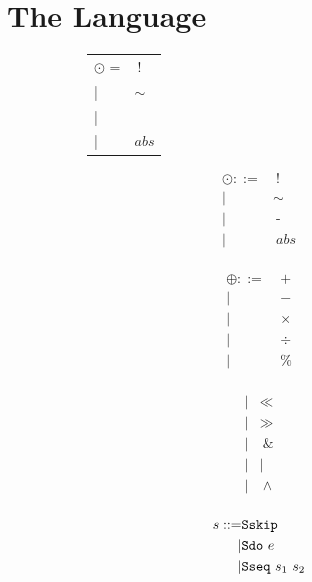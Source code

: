 \documentclass[acmsmall,review,anonymous]{acmart}\settopmatter{printfolios=true,printccs=false,printacmref=false}
\begin{document}
\section{The Language}

\begin{figure}
  \begin{subfigure}[t]{0.3\textwidth}
    \begin{minipage}[t]{0.4\textwidth}
      \begin{tabular}{l l}
        \(\odot\) = & \(~!\) \\
        | &\(\sim\) \\
        | &\text{-} \\
        | &\(\mathit{abs}\) \\
      \end{tabular}
      \[\begin{aligned}
      \odot ::= & ~ ! \\
      | & \sim \\
      | & ~ \text{-} \\
      | & ~ \mathit{abs} \\
      \end{aligned}\]
    \end{minipage}
    \begin{minipage}[t]{0.3\textwidth}
      \[\begin{aligned}
      \oplus ::= & ~ + \\
      | & ~ - \\
      | & ~ \times \\
      | & ~ \div \\
      | & ~ \% \\
      \end{aligned}\]
    \end{minipage}
    \begin{minipage}[t]{0.25\textwidth}
      \[\begin{aligned}
      | & \ll \\
      | & \gg \\
      | & ~ \& \\
      | & \mid \\
      | & ~ \wedge \\
      \end{aligned}\]
    \end{minipage}
    \[\begin{aligned}
    \stmt ::= & \sskip \\
    | & \sdo{\expr} \\
    | & \sseq{\stmt_1}{\stmt_2} \\

\end{aligned}\]
\end{subfigure}
\end{figure}
\end{document}

